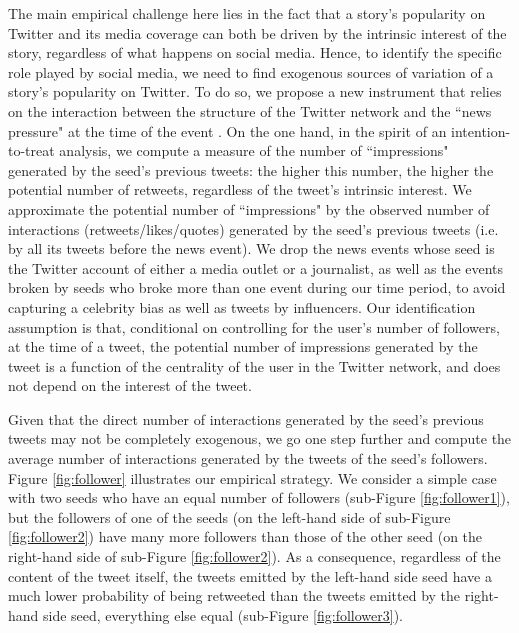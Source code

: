 The main empirical challenge here lies in the fact that a story's popularity on Twitter and its media coverage can both be driven by the intrinsic interest of the story, regardless of what happens on social media. Hence, to identify the specific role played by social media, we need to find exogenous sources of variation of a story's popularity on Twitter. To do so, we propose a new instrument that relies on the interaction between the structure of the Twitter network and the ``news pressure" at the time of the event \citep[in the spirit of][]{EisenseeStromberg2007}. On the one hand, in the spirit of an intention-to-treat analysis, we compute a measure of the number of ``impressions" generated by the seed's previous tweets: the higher this number, the higher the potential number of retweets, regardless of the tweet's intrinsic interest. We approximate the potential number of ``impressions" by the observed number of interactions (retweets/likes/quotes) generated by the seed's previous tweets (i.e. by all its tweets before the news event). We drop the news events whose seed is the Twitter account of either a media outlet or a journalist, as well as the events broken by seeds who broke more than one event during our time period, to avoid capturing a celebrity bias as well as tweets by influencers. Our identification assumption is that, conditional on controlling for the user's number of followers, at the time of a tweet, the potential number of impressions generated by the tweet is a function of the centrality of the user in the Twitter network, and does not depend on the interest of the tweet.

Given that the direct number of interactions generated by the seed's previous tweets may not be completely exogenous, we go one step further and compute the average number of interactions generated by the tweets of the seed's followers. Figure \ref{fig:follower} illustrates our empirical strategy. We consider a simple case with two seeds who have an equal number of followers (sub-Figure \ref{fig:follower1}), but the followers of one of the seeds (on the left-hand side of sub-Figure \ref{fig:follower2}) have many more followers than those of the other seed (on the right-hand side of sub-Figure \ref{fig:follower2}). As a consequence, regardless of the content of the tweet itself, the tweets emitted by the left-hand side seed have a much lower probability of being retweeted than the tweets emitted by the right-hand side seed, everything else equal (sub-Figure \ref{fig:follower3}).


